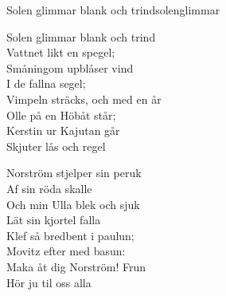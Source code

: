 \begin{song}{Solen glimmar blank och trind}{solenglimmar}

\begin{vers}
Solen glimmar blank och trind\\
Vattnet likt en spegel;\\
Småningom upblåser vind\\
I de fallna segel;\\
Vimpeln sträcks, och med en år\\
Olle på en Höbåt står;\\
Kerstin ur Kajutan går\\
Skjuter lås och regel\\
\end{vers}
\begin{vers}
Norström stjelper sin peruk\\
Af sin röda skalle\\
Och min Ulla blek och sjuk\\
Lät sin kjortel falla\\
Klef så bredbent i paulun;\\
Movitz efter med basun:\\
Maka åt dig Norström! Frun\\
Hör ju til oss alla\\
\end{vers}
\end{song}
